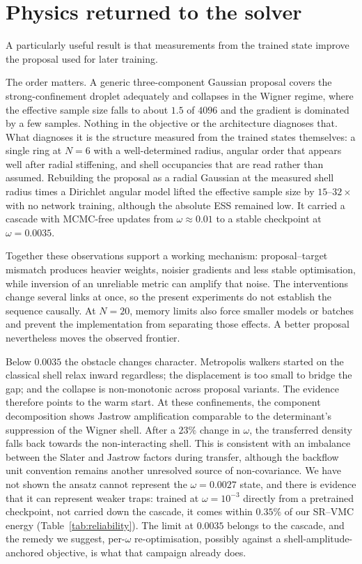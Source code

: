 \section{Physics returned to the solver}
\label{sec:feedback-discussion}

A particularly useful result is that measurements from the trained state improve the
proposal used for later training.

The order matters. A generic three-component Gaussian proposal covers the strong-confinement
droplet adequately and collapses in the Wigner regime, where the effective sample size falls
to about $1.5$ of $4096$ and the gradient is dominated by a few samples. Nothing in the objective
or the architecture diagnoses that. What diagnoses it is the structure measured from the
trained states themselves: a single ring at $N{=}6$ with a well-determined radius, angular
order that appears well after radial stiffening, and shell occupancies that are read rather
than assumed. Rebuilding the proposal as a radial Gaussian at the measured shell radius times
a Dirichlet angular model lifted the effective sample size by $15$--$32\times$ with no
network training, although the absolute ESS remained low. It carried a cascade with
MCMC-free updates from $\omega\approx0.01$ to a stable checkpoint at $\omega=0.0035$.

Together these observations support a working mechanism: proposal--target mismatch produces
heavier weights, noisier gradients and less stable optimisation, while inversion of an
unreliable metric can amplify that noise. The interventions change several links at once, so
the present experiments do not establish the sequence causally. At $N{=}20$, memory limits
also force smaller models or batches and prevent the implementation from separating those
effects. A better proposal nevertheless moves the observed frontier.

Below $0.0035$ the obstacle changes character. Metropolis walkers started on the classical
shell relax inward regardless; the displacement is too small to bridge the gap; and the
collapse is non-monotonic across proposal variants. The evidence therefore points to the
warm start. At these confinements, the component decomposition shows Jastrow amplification
comparable to the determinant's suppression of the Wigner shell. After a $23\%$ change in
$\omega$, the transferred density falls back towards the non-interacting shell. This is consistent
with an imbalance between the Slater and Jastrow factors during transfer, although the
backflow unit convention remains another unresolved source of non-covariance. We have not
shown the ansatz cannot represent the $\omega=0.0027$ state, and
there is evidence that it can represent weaker traps: trained at $\omega=10^{-3}$ directly from
a pretrained checkpoint, not carried down the cascade, it comes within $0.35\%$ of our SR--VMC
energy (Table~\ref{tab:reliability}). The limit at $0.0035$ belongs to the cascade, and the
remedy we suggest, per-$\omega$ re-optimisation, possibly against a shell-amplitude-anchored
objective, is what that campaign already does.


